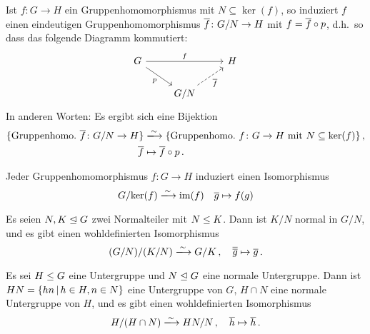 \begin{theorem}[Homomorphiesatz]
  Ist $f \colon G \to H$ ein Gruppenhomomorphismus mit $N \subseteq \ker(f)$, so induziert $f$ einen eindeutigen Gruppenhomomorphismus $\overline{f} \colon G/N \to H$ mit $f = \overline{f} \circ p$, d.h.\ so dass das folgende Diagramm kommutiert:
  \[
    \begin{tikzcd}
        G
        \arrow{rr}[above]{f}
        \arrow{dr}[below left]{p}
      & {}
      & H
      \\
        {}
      & G/N
        \arrow[dashed]{ru}[below right]{\induced{f}}
      & {}
    \end{tikzcd}
  \]
  In anderen Worten:
  Es ergibt sich eine Bijektion
  \begin{align*}
                            \{ \text{Gruppenhomo.\ $\induced{f} \colon G/N \to H$} \}
    &\xlongrightarrow{\sim} \{ \text{Gruppenhomo.\ $f \colon G \to H$ mit $N \subseteq \ker(f)$} \} \,,  \\
                            \induced{f}
    &\mapsto                \induced{f} \circ p \,.
  \end{align*}
\end{theorem}

\begin{corollary}[1.\ Isomorphiesatz]
  Jeder Gruppenhomomorphismus $f \colon G \to H$ induziert einen Isomorphismus
  \[
                            G/{\ker(f)}
    \xlongrightarrow{\sim}  \im(f)
    \quad                   \class{g}
    \mapsto                 f(g)
  \]
\end{corollary}

\begin{corollary}[2.\ Isomorphiesatz]
  Es seien $N, K \mathrel{\trianglelefteq} G$ zwei Normalteiler mit $N \mathrel{\leq} K$.
  Dann ist $K/N$ normal in $G/N$, und es gibt einen wohldefinierten Isomorphismus
  \[
                            (G/N)/(K/N)
    \xlongrightarrow{\sim}  G/K \,,
    \quad                   \class{ \class{g} }
    \mapsto                 \class{g} \,.
  \]
\end{corollary}

\begin{corollary}[3.\ Isomorphiesatz]
  Es sei $H \mathrel{\leq} G$ eine Untergruppe und $N \mathrel{\trianglelefteq} G$ eine normale Untergruppe.
  Dann ist $HN = \{hn \suchthat h \in H, n \in N\}$ eine Untergruppe von $G$, $H \cap N$ eine normale Untergruppe von $H$, und es gibt einen wohldefinierten Isomorphismus
  \[
                            H/(H \cap N)
    \xlongrightarrow{\sim}  HN/N \,,
    \quad                   \class{h}
    \mapsto                 \class{h} \,.
  \]
\end{corollary}



